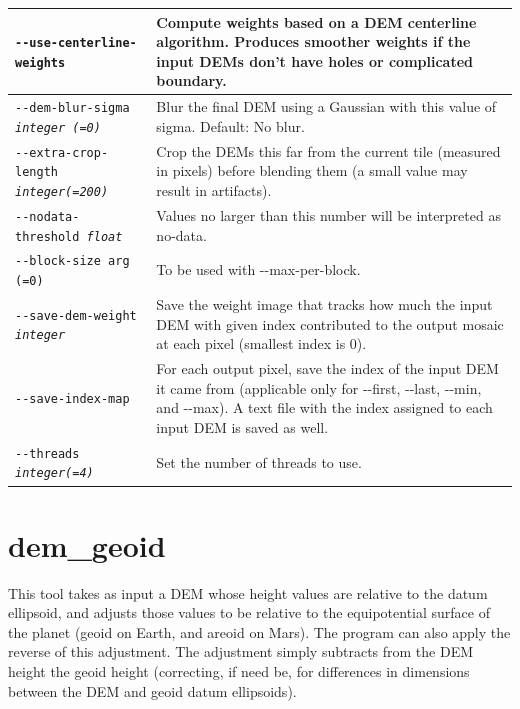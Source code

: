 \begin{longtable}{|l|p{10cm}|}
\texttt{-\/-use-centerline-weights} &
Compute weights based on a DEM centerline algorithm. Produces smoother weights if the input DEMs don't have holes or complicated boundary.
\\ \hline

\texttt{-\/-dem-blur-sigma \textit{integer (=0)} } & Blur the final DEM using a Gaussian with this value of sigma. Default: No blur. \\ \hline

\texttt{-\/-extra-crop-length \textit{integer(=200)}} &
Crop the DEMs this far from the current tile (measured in pixels) before blending them (a small value may result in artifacts).
\\ \hline

\texttt{-\/-nodata-threshold \textit{float}} & Values no larger than this number will be interpreted as no-data.\\ \hline

\texttt{-\/-block-size arg (=0)} & To be used with -\/-max-per-block.\\ \hline

\texttt{-\/-save-dem-weight \textit{integer}} &
Save the weight image that tracks how much the input DEM with given index contributed to the output mosaic at each pixel (smallest index is 0).\\ \hline

\texttt{-\/-save-index-map} &
For each output pixel, save the index of the input DEM it came from
(applicable only for -\/-first, -\/-last, -\/-min, and -\/-max). A text
file with the index assigned to each input DEM is saved as well.\\ \hline

\texttt{-\/-threads \textit{integer(=4)}}
& Set the number of threads to use. \\ \hline
\end{longtable}

\clearpage

\section{dem\_geoid}
\label{demgeoid}

This tool takes as input a \ac{DEM} whose height values are relative to the
datum ellipsoid, and adjusts those values to be relative to the
equipotential surface of the planet (geoid on Earth, and areoid on
Mars). The program can also apply the reverse of this adjustment. The
adjustment simply subtracts from the DEM height the geoid height
(correcting, if need be, for differences in dimensions between the DEM
and geoid datum ellipsoids).

